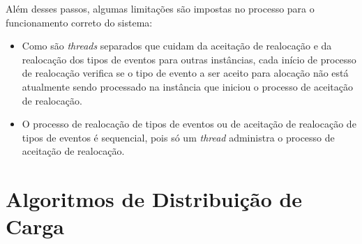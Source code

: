 Além desses passos, algumas limitações são impostas no processo para o funcionamento correto do sistema:
\begin{itemize}

\item Como são \textit{threads} separados que cuidam da aceitação de realocação e da realocação dos tipos de eventos para outras instâncias,  cada início de processo de realocação verifica se o tipo de evento a ser aceito para alocação não está atualmente sendo processado na instância que iniciou o processo de aceitação de realocação.

\item O processo de realocação de tipos de eventos ou de aceitação de realocação de tipos de eventos é sequencial, pois só um \textit{thread} administra o processo de aceitação de realocação.

\end{itemize}


\section{Algoritmos de Distribuição de Carga}
\label{sec:loadDistribution}

